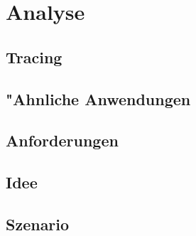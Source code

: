
\chapter{Analyse}



\section{Tracing} 



\section{"Ahnliche Anwendungen} 



\section{Anforderungen} 
\label{sec:anforderungen}



\section{Idee} 



\section{Szenario} 

